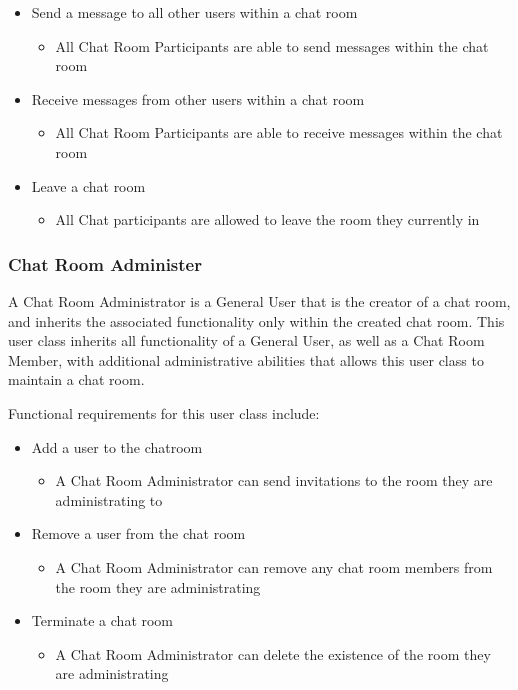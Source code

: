 \documentclass[12pt]{article}
\begin{document}
\begin{itemize}
\item Send a message to all other users within a chat room
     \begin{itemize}
        \item All Chat Room Participants are able to send messages within the chat room 
      \end{itemize} 
\item Receive messages from other users within a chat room
\begin{itemize}
        \item All Chat Room Participants are able to receive messages within the chat room
      \end{itemize} 
\item Leave a chat room
\begin{itemize}
 \item All Chat participants are allowed to leave the room they currently in
      \end{itemize} 
\end{itemize}

\subsubsection{Chat Room Administer}
A Chat Room Administrator is a General User that is the creator of a chat room, and inherits the associated functionality only within the created chat room. This user class inherits all functionality of a General User, as well as a Chat Room Member, with additional administrative abilities that allows this user class to maintain a chat room.

Functional requirements for this user class include:
\begin{itemize}
\item Add a user to the chatroom 
  \begin{itemize}
        \item A Chat Room Administrator can send invitations to the room they are administrating to 
      \end{itemize} 
\item Remove a user from the chat room
\begin{itemize}
 \item A Chat Room Administrator can remove any chat room members from the room they are administrating
      \end{itemize} 
\item Terminate a chat room
\begin{itemize}
 \item A Chat Room Administrator can delete the existence of the room they are administrating
      \end{itemize} 
\end{itemize}
\end{document}
